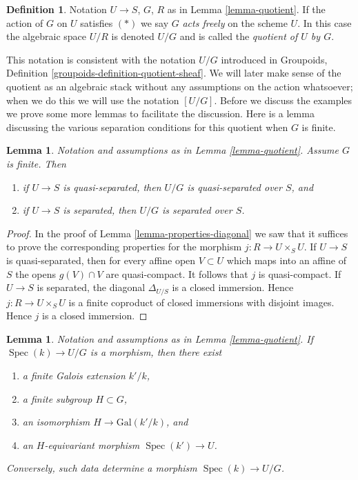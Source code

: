 \documentclass{stacks-project}
\theoremstyle{plain}
\newtheorem{lemma}[subsection]{Lemma}
\theoremstyle{definition}
\newtheorem{definition}[subsection]{Definition}
\theoremstyle{remark}
\numberwithin{equation}{subsection}
\def\Spec{\mathop{\mathrm{Spec}}}
\begin{document}
\begin{definition}
\label{definition-quotient}
Notation $U \to S$, $G$, $R$ as in Lemma \ref{lemma-quotient}.
If the action of $G$ on $U$ satisfies $(*)$ we say $G$ {\it acts freely}
on the scheme $U$. In this case the algebraic space $U/R$ is denoted
$U/G$ and is called the {\it quotient of $U$ by $G$}.
\end{definition}

\noindent
This notation is consistent with the notation $U/G$ introduced in
Groupoids, Definition \ref{groupoids-definition-quotient-sheaf}.
We will later make sense of the quotient as an algebraic stack without
any assumptions on the action whatsoever; when we do this we will use the
notation $[U/G]$. Before we discuss the examples we prove
some more lemmas to facilitate the discussion. Here is a lemma discussing the
various separation conditions for this quotient when $G$ is finite.

\begin{lemma}
\label{lemma-quotient-finite-separated}
Notation and assumptions as in Lemma \ref{lemma-quotient}.
Assume $G$ is finite. Then
\begin{enumerate}
\item if $U \to S$ is quasi-separated, then $U/G$ is quasi-separated
over $S$, and
\item if $U \to S$ is separated, then $U/G$ is separated over $S$.
\end{enumerate}
\end{lemma}

\begin{proof}
In the proof of Lemma \ref{lemma-properties-diagonal}
we saw that it suffices to prove the
corresponding properties for the morphism $j : R \to U \times_S U$.
If $U \to S$ is quasi-separated, then for every affine open $V \subset U$
which maps into an affine of $S$
the opens $g(V) \cap V$ are quasi-compact. It follows that $j$ is
quasi-compact.
If $U \to S$ is separated, the diagonal $\Delta_{U/S}$ is a closed
immersion. Hence $j : R \to U \times_S U$ is a finite coproduct
of closed immersions with disjoint images. Hence $j$ is a closed immersion.
\end{proof}

\begin{lemma}
\label{lemma-quotient-field-map}
Notation and assumptions as in Lemma \ref{lemma-quotient}.
If $\Spec(k) \to U/G$ is a morphism, then there exist
\begin{enumerate}
\item a finite Galois extension $k'/k$,
\item a finite subgroup $H \subset G$,
\item an isomorphism $H \to \text{Gal}(k'/k)$, and
\item an $H$-equivariant morphism $\Spec(k') \to U$.
\end{enumerate}
Conversely, such data determine a morphism $\Spec(k) \to U/G$.
\end{lemma}
\end{document}
